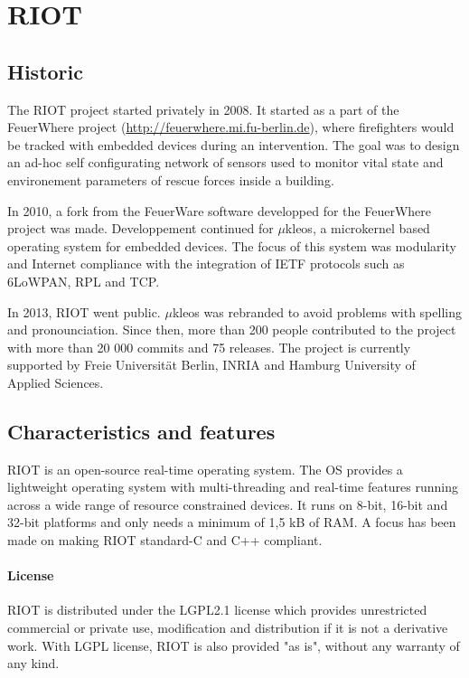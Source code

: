 \section{RIOT}

\subsection{Historic}

The RIOT project started privately in 2008.
It started as a part of the FeuerWhere project (\url{http://feuerwhere.mi.fu-berlin.de}), 
    where firefighters would be tracked with embedded devices during an intervention.
The goal was to design an ad-hoc self configurating network of sensors used 
    to monitor vital state and environement parameters of rescue forces inside a building.

In 2010, a fork from the FeuerWare software developped for the FeuerWhere project was made.
Developpement continued for $\mu$kleos\cite{microkleos}, a microkernel based operating system for embedded devices.
The focus of this system was modularity and Internet compliance with the integration of IETF protocols such as 6LoWPAN, RPL and TCP.

In 2013, RIOT went public.
$\mu$kleos was rebranded to avoid problems with spelling and pronounciation.
Since then, more than 200 people contributed to the project with more than 20 000 commits and 75 releases.
The project is currently supported by Freie Universität Berlin, INRIA and Hamburg University of Applied Sciences.

\subsection{Characteristics and features}
RIOT is an open-source real-time operating system.
The OS provides a lightweight operating system with multi-threading and real-time features running across a wide range of resource constrained devices.
It runs on 8-bit, 16-bit and 32-bit platforms and only needs a minimum of 1,5 kB of RAM.
A focus has been made on making RIOT standard-C and C++ compliant.

\paragraph{License} RIOT is distributed under the LGPL2.1 license which provides unrestricted commercial or private use, modification and distribution if it is not a derivative work.
With LGPL license, RIOT is also provided "as is", without any warranty of any kind.

